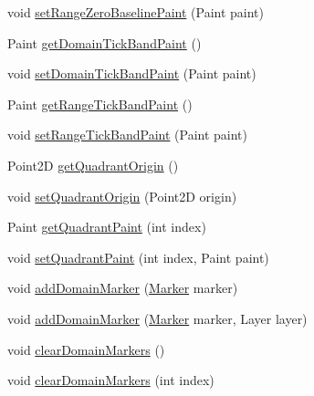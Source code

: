 \begin{DoxyCompactItemize}
void \mbox{\hyperlink{classorg_1_1jfree_1_1chart_1_1plot_1_1_x_y_plot_a0f5bd5185f2a8171cf30473aa89fe1b7}{set\+Range\+Zero\+Baseline\+Paint}} (Paint paint)
\item 
Paint \mbox{\hyperlink{classorg_1_1jfree_1_1chart_1_1plot_1_1_x_y_plot_aab6b385287de8c012990c2dd3e2ff126}{get\+Domain\+Tick\+Band\+Paint}} ()
\item 
void \mbox{\hyperlink{classorg_1_1jfree_1_1chart_1_1plot_1_1_x_y_plot_ab102d5a43987a1404ce99b0689772132}{set\+Domain\+Tick\+Band\+Paint}} (Paint paint)
\item 
Paint \mbox{\hyperlink{classorg_1_1jfree_1_1chart_1_1plot_1_1_x_y_plot_a38f62f0996960915c78769ff45e6b848}{get\+Range\+Tick\+Band\+Paint}} ()
\item 
void \mbox{\hyperlink{classorg_1_1jfree_1_1chart_1_1plot_1_1_x_y_plot_a83d3ff283ef61b61af7cd9669194f8e7}{set\+Range\+Tick\+Band\+Paint}} (Paint paint)
\item 
Point2D \mbox{\hyperlink{classorg_1_1jfree_1_1chart_1_1plot_1_1_x_y_plot_a618e05d8ad1e56930231dd6a4de3661c}{get\+Quadrant\+Origin}} ()
\item 
void \mbox{\hyperlink{classorg_1_1jfree_1_1chart_1_1plot_1_1_x_y_plot_a6b22586993f163c5212ed21517b32851}{set\+Quadrant\+Origin}} (Point2D origin)
\item 
Paint \mbox{\hyperlink{classorg_1_1jfree_1_1chart_1_1plot_1_1_x_y_plot_a20b4caa204dbf0f23b6d1400185baa97}{get\+Quadrant\+Paint}} (int index)
\item 
void \mbox{\hyperlink{classorg_1_1jfree_1_1chart_1_1plot_1_1_x_y_plot_a52c03f4be6805639d5597eb247fcd249}{set\+Quadrant\+Paint}} (int index, Paint paint)
\item 
void \mbox{\hyperlink{classorg_1_1jfree_1_1chart_1_1plot_1_1_x_y_plot_aef4dcf846a69ccf394a1421ef80d6d0f}{add\+Domain\+Marker}} (\mbox{\hyperlink{classorg_1_1jfree_1_1chart_1_1plot_1_1_marker}{Marker}} marker)
\item 
void \mbox{\hyperlink{classorg_1_1jfree_1_1chart_1_1plot_1_1_x_y_plot_ada13a42961574a3ea22db269e2f205b9}{add\+Domain\+Marker}} (\mbox{\hyperlink{classorg_1_1jfree_1_1chart_1_1plot_1_1_marker}{Marker}} marker, Layer layer)
\item 
void \mbox{\hyperlink{classorg_1_1jfree_1_1chart_1_1plot_1_1_x_y_plot_a0b3732025a192e27fdf6e45543d9aa4f}{clear\+Domain\+Markers}} ()
\item 
void \mbox{\hyperlink{classorg_1_1jfree_1_1chart_1_1plot_1_1_x_y_plot_a5ce7a15b263266b4b64868b1a27034ee}{clear\+Domain\+Markers}} (int index)
\item 

\end{DoxyCompactItemize}
